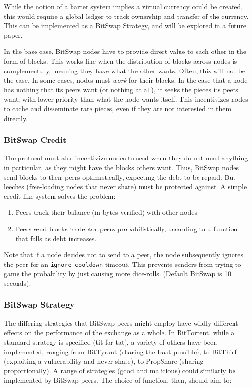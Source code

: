 \documentclass{sig-alternate}
\begin{document}
While the notion of a barter system implies a virtual currency could be
created, this would require a global ledger to track ownership
and transfer of the currency. This can be implemented as a BitSwap Strategy, and will be explored in a future paper.

In the base case, BitSwap nodes have to provide direct value to each other
in the form of blocks. This works fine when the distribution of blocks across
nodes is complementary, meaning they have what the other wants. Often, this
will not be the case. In some cases, nodes must \textit{work} for their
blocks. In the case that a node has nothing that its peers want (or
nothing at all), it seeks the pieces its peers want, with lower
priority than what the node wants itself. This incentivizes nodes to cache and
disseminate rare pieces, even if they are not interested in them directly.

\subsubsection{BitSwap Credit}

The protocol must also incentivize nodes to seed when they do not need
anything in particular, as they might have the blocks others want. Thus,
BitSwap nodes send blocks to their peers optimistically, expecting the debt to
be repaid. But leeches (free-loading nodes that never share) must be protected against. A simple credit-like system solves the problem:

\begin{enumerate}
  \item Peers track their balance (in bytes verified) with other nodes.
  \item Peers send blocks to debtor peers probabilistically, according to
        a function that falls as debt increases.
\end{enumerate}

Note that if a node decides not to send to a peer, the node subsequently
ignores the peer for an \texttt{ignore\_cooldown} timeout. This prevents
senders from trying to game the probability by just causing more dice-rolls.
(Default BitSwap is 10 seconds).

\subsubsection{BitSwap Strategy}

The differing strategies that BitSwap peers might employ have wildly different effects on the performance of the exchange as a whole. In BitTorrent, while a standard strategy is specified (tit-for-tat), a variety of others have been implemented, ranging from BitTyrant \cite{BitTyrant} (sharing the least-possible), to BitThief \cite{BitThief} (exploiting a vulnerability and never share), to PropShare \cite{PropShare} (sharing proportionally). A range of strategies (good and malicious) could similarly be implemented by BitSwap peers. The choice of function, then, should aim to:
\end{document}

